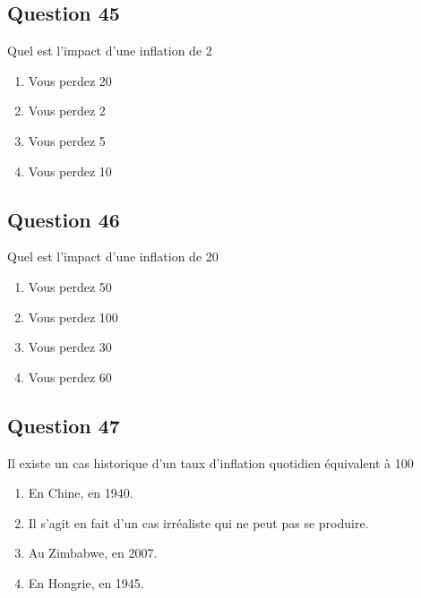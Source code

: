 \documentclass[12pt,a4paper]{article}
\begin{document}
\bigskip


\subsection*{Question 45}
Quel est l'impact d'une inflation de 2%

\begin{enumerate}[label=\Alph*., leftmargin=*]
\item Vous perdez 20%
\item Vous perdez 2%
\item Vous perdez 5%
\item Vous perdez 10%
\end{enumerate}

\bigskip


\subsection*{Question 46}
Quel est l'impact d'une inflation de 20%

\begin{enumerate}[label=\Alph*., leftmargin=*]
\item Vous perdez 50%
\item Vous perdez 100%
\item Vous perdez 30%
\item Vous perdez 60%
\end{enumerate}

\bigskip


\subsection*{Question 47}
Il existe un cas historique d'un taux d'inflation quotidien équivalent à 100 %

\begin{enumerate}[label=\Alph*., leftmargin=*]
\item En Chine, en 1940.
\item Il s'agit en fait d'un cas irréaliste qui ne peut pas se produire.
\item Au Zimbabwe, en 2007.
\item En Hongrie, en 1945.
\end{enumerate}
\end{document}
